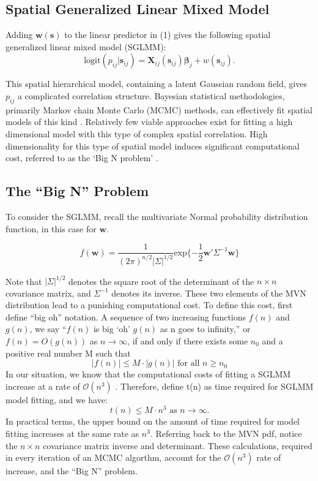 \subsection{Spatial Generalized Linear Mixed Model}
Adding $\pmb{w}(\pmb{s})$ to the linear predictor in (1) gives the following spatial generalized linear mixed model (SGLMM):
\begin{equation}
\text{logit}(p_{ij}|\pmb{s}_{ij}) = \pmb{X}_{ij}(\pmb{s}_{ij}) \pmb{\beta}_{j} + w(\pmb{s}_{ij}).
\end{equation}

This spatial hierarchical model, containing a latent Gaussian random field, gives $p_{ij}$ a complicated correlation structure. Bayesian statistical methodologies, primarily Markov chain Monte Carlo (MCMC) methods, can effectively fit spatial models of this kind \citep{Banerjee2014}. Relatively few viable approaches exist for fitting a high dimensional model with this type of complex spatial correlation. High dimensionality for this type of spatial model induces significant computational cost, referred to as the `Big N problem' \citep{Lindgren2011}.

\subsection{The ``Big N'' Problem}

To consider the SGLMM, recall the multivariate Normal probability distribution function, in this case for $\pmb{w}$.

$$ f(\pmb{w}) = \frac{1}{(2\pi)^{n/2}|\Sigma|^{1/2}} \text{exp}\{ -\frac{1}{2}\pmb{w}'\Sigma^{-1}\pmb{w} \}$$

Note that $|\Sigma|^{1/2}$ denotes the square root of  the determinant of the $n \times n$ covariance matrix, and $\Sigma^{-1}$ denotes its inverse. These two elements of the MVN distribution lead to a punishing computational cost. To define this cost, first define ``big oh'' notation. A sequence of two increasing functions $f(n)$ and $g(n)$, we say ``$f(n)$ is big `oh' $g(n)$ as n goes to infinity,'' or $f(n) = O(g(n))$ as $n \rightarrow \infty$, if and only if there exists some $n_{0}$ and a positive real number M such that
  $$|f(n)| \leq M \cdot |g(n)| \text{ for all } n \geq n_0 $$
In our situation, we know that the computational costs of fitting a SGLMM increase at a rate of $\mathcal{O}(n^{3})$ \citep{Finley2009}. Therefore, define t(n) as time required for SGLMM model fitting, and we have:
$$t(n) \leq M \cdot n^{3} \text{ as } n \rightarrow \infty.$$
In practical terms, the upper bound on the amount of time required for model fitting increases at the same rate as $n^{3}$. Referring back to the MVN pdf, notice the $n \times n$ covariance matrix inverse and determinant. These calculations, required in every iteration of an MCMC algorthm, account for the $\mathcal{O}(n^{3})$ rate of increase, and the ``Big N'' problem.

